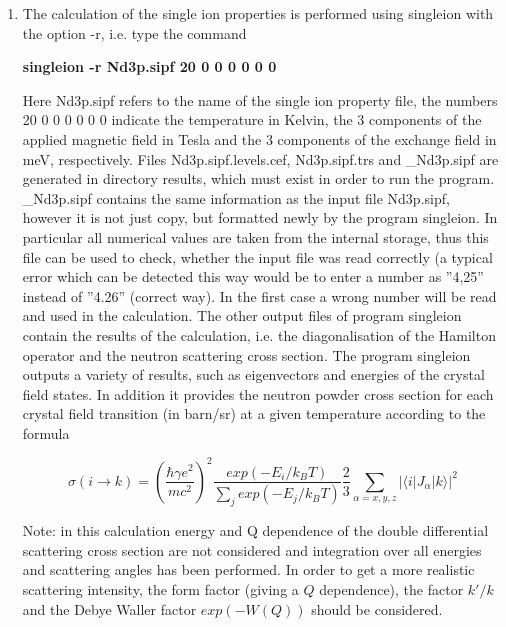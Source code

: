 \begin{enumerate} 
\item
The calculation of the single ion properties is 
performed using {\prg singleion} with the option {\prg -r}, 
i.e. type the command 

{\bf singleion -r Nd3p.sipf 20 0 0 0  0 0 0} 

Here Nd3p.sipf refers to the name of the single ion property file, the numbers 20 0 0 0  0 0 0 indicate the
temperature in Kelvin, the 3 components of the applied magnetic field in Tesla and the 3 components
of the exchange field in meV, respectively.
Files {\prg Nd3p.sipf.levels.cef, Nd3p.sipf.trs} and {\prg \_Nd3p.sipf}
 are generated in directory {\prg results}, which must exist in order to run the program.
{\prg \_Nd3p.sipf} contains the same information as the input file {\prg Nd3p.sipf}, however
it is not just  copy, but formatted newly by the program {\prg singleion}. In particular
 all numerical values are taken from the internal storage, thus this file can be used to
check, whether the input file was read correctly (a typical error which can be detected
this way would be to enter a number as ''4,25''  instead of ''4.26'' (correct way). In the
first case a wrong number will be read and used in the calculation.
The other output files of program {\prg singleion} contain the results of the calculation, i.e.
the diagonalisation of the Hamilton operator and the neutron scattering cross section.
The program {\prg singleion} outputs a variety of results, such as eigenvectors and 
energies of the crystal field states. In addition it provides 
the neutron powder cross section for each crystal field
transition (in barn/sr) at a given temperature according to the formula

\begin{equation}
\sigma(i\rightarrow k)=\left(\frac{\hbar \gamma e^2}{mc^2}\right)^2
\frac{exp(-E_i/k_BT)}{\sum_j exp(-E_j/k_BT)} \frac{2}{3}\sum_{\alpha=x,y,z}
|\langle i|J_{\alpha}|k\rangle|^2
\end{equation}

Note: in this calculation energy and Q dependence
of the double differential scattering cross section are not considered and
integration over all energies and scattering angles has been performed.
In order to get a more realistic scattering intensity, the
form factor (giving a $Q$ dependence), the
factor $k'/k$ and the Debye Waller factor $exp(-W(Q))$ should be considered.


\end{enumerate}
